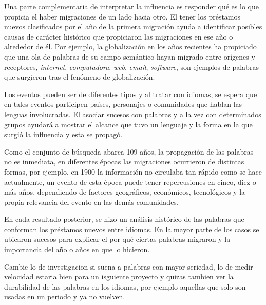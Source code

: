 Una parte complementaria de interpretar la influencia es responder qué es lo
que propicia el haber migraciones de un lado hacia otro.  El tener los
préstamos nuevos clasificados por el año de la primera migración ayuda a
identificar posibles causas de carácter histórico que propiciaron las
migraciones en ese año o alrededor de él.  Por ejemplo, la globalización en los
años recientes ha propiciado que una ola de palabras de su campo semántico
hayan migrado entre orígenes y receptores,  \textit{internet},
\textit{computadora}, \textit{web}, \textit{email},  \textit{software}, son
ejemplos de palabras que surgieron tras el fenómeno de globalización. 

Los eventos pueden ser de diferentes tipos y al tratar con idiomas, se espera
que en tales eventos participen países, personajes o  comunidades que hablan
las lenguas involucradas.  El asociar sucesos con palabras y a la vez con
determinados grupos ayudará a mostrar el alcance que tuvo un lenguaje y la
forma en la que surgió la influencia y esta se propagó. 

Como el conjunto de búsqueda abarca 109 años,  la propagación de las palabras
no es inmediata, en diferentes épocas las migraciones ocurrieron de distintas
formas,  por ejemplo, en 1900 la información no circulaba tan rápido como se
hace actualmente, un evento de esta época puede tener repercusiones en cinco,
diez o más años,  dependiendo de factores geográficos, económicos, tecnológicos
y  la  propia relevancia del evento en las demás comunidades.

En cada resultado posterior, se hizo un análisis histórico de las
palabras que conforman los préstamos nuevos entre idiomas. En la mayor parte
de los casos se ubicaron sucesos para explicar el por qué ciertas palabras
migraron y la importancia del año o años en que lo hicieron. 

\begin{tcolorbox}
	[colback=red!5!white,colframe=red!75!black]
	Cambie lo de investigacion si suena a palabras con mayor seriedad,  lo de medir velocidad estaria bien para un isguiente proyecto y quizas tambien ver la durabilidad de las palabras en los idiomas, por ejemplo aquellas que solo son usadas en un periodo y ya no vuelven.
\end{tcolorbox}

